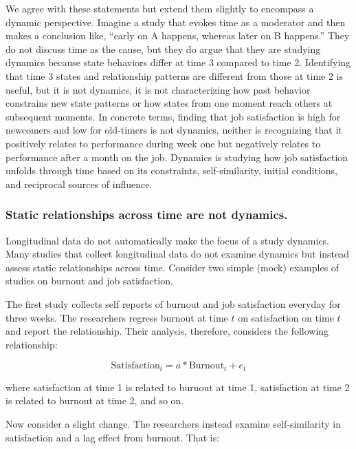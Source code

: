\documentclass[english,,man]{apa6}
\theoremstyle{definition}
\theoremstyle{definition}
\theoremstyle{definition}
\theoremstyle{remark}
\begin{document}
We agree with these statements but extend them slightly to encompass a
dynamic perspective. Imagine a study that evokes time as a moderator and
then makes a conclusion like, \enquote{early on A happens, whereas later
on B happens.} They do not discuss time as the cause, but they do argue
that they are studying dynamics because state behaviors differ at time 3
compared to time 2. Identifying that time 3 states and relationship
patterns are different from those at time 2 is useful, but it is not
dynamics, it is not characterizing how past behavior constrains new
state patterns or how states from one moment reach others at subsequent
moments. In concrete terms, finding that job satisfaction is high for
newcomers and low for old-timers is not dynamics, neither is recognizing
that it positively relates to performance during week one but negatively
relates to performance after a month on the job. Dynamics is studying
how job satisfaction unfolds through time based on its constraints,
self-similarity, initial conditions, and reciprocal sources of
influence.

\hypertarget{static-relationships-across-time-are-not-dynamics.}{%
\subsubsection{Static relationships across time are not
dynamics.}\label{static-relationships-across-time-are-not-dynamics.}}

Longitudinal data do not automatically make the focus of a study
dynamics. Many studies that collect longitudinal data do not examine
dynamics but instead assess static relationships across time. Consider
two simple (mock) examples of studies on burnout and job satisfaction.

The first study collects self reports of burnout and job satisfaction
everyday for three weeks. The researchers regress burnout at time \(t\)
on satisfaction on time \(t\) and report the relationship. Their
analysis, therefore, considers the following relationship:

\begin{equation}
\textrm{Satisfaction}_{t} = a * \textrm{Burnout}_{t} + e_{t}
\end{equation}

\noindent where satisfaction at time 1 is related to burnout at time 1,
satisfaction at time 2 is related to burnout at time 2, and so on.

Now consider a slight change. The researchers instead examine
self-similarity in satisfaction and a lag effect from burnout. That is:
\end{document}
